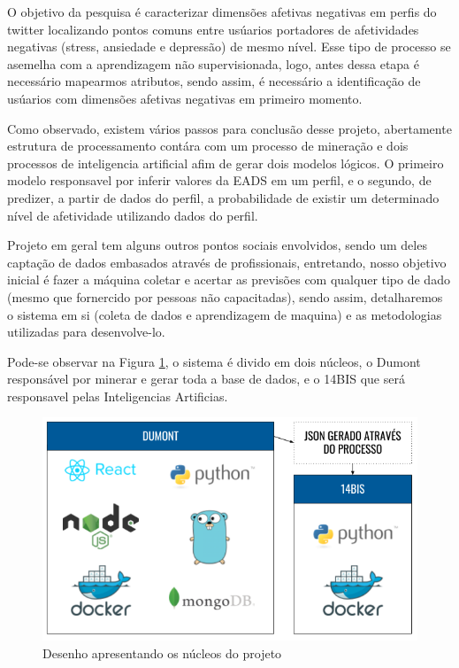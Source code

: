 O objetivo da pesquisa é caracterizar dimensões afetivas negativas em perfis do twitter localizando pontos comuns entre usúarios portadores de afetividades negativas (stress, ansiedade e depressão) de mesmo nível. Esse tipo de processo se asemelha com a aprendizagem não supervisionada, logo, antes dessa etapa é necessário mapearmos atributos, sendo assim, é necessário a identificação de usúarios com dimensões afetivas negativas em primeiro momento.

Como observado, existem vários passos para conclusão desse projeto, abertamente estrutura de processamento contára com um processo de mineração e dois processos de inteligencia artificial afim de gerar dois modelos lógicos. O primeiro modelo responsavel por inferir valores da EADS em um perfil, e o segundo, de predizer, a partir de dados do perfil, a probabilidade de existir um determinado nível de afetividade utilizando dados do perfil.

Projeto em geral tem alguns outros pontos sociais envolvidos, sendo um deles captação de dados embasados através de profissionais, entretando, nosso objetivo inicial é fazer a máquina coletar e acertar as previsões com qualquer tipo de dado (mesmo que fornercido por pessoas não capacitadas), sendo assim, detalharemos o sistema em si (coleta de dados e aprendizagem de maquina) e as metodologias utilizadas para desenvolve-lo.

Pode-se observar na Figura \ref{fig:tecnologias}, o sistema é divido em dois núcleos, o Dumont responsável por minerar e gerar toda a base de dados, e o 14BIS que será responsavel pelas Inteligencias Artificias.

\begin{figure}
    \centering
    \includegraphics[width=1\textwidth]{imagens/tecnologias.png}
    \caption{Desenho apresentando os núcleos do projeto}
    \label{fig:tecnologias}
\end{figure}

